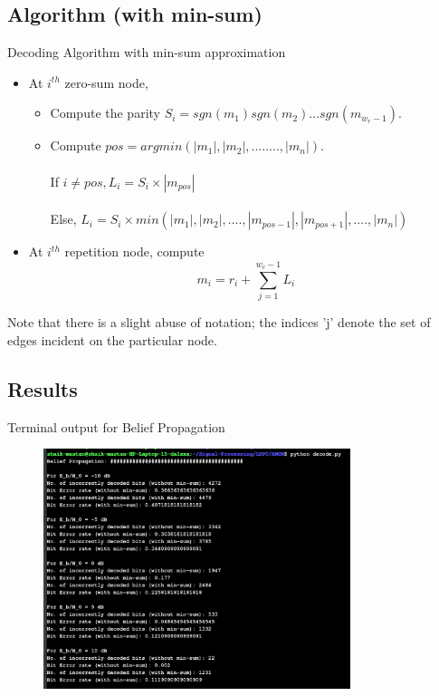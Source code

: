 \subsection{Algorithm (with min-sum)}
\begin{frame}{Decoding Algorithm with min-sum approximation}
    \begin{itemize}
        \item At $i^{th}$ zero-sum node, 
        \begin{itemize}
            \item Compute the parity $S_i = sgn(m_1)sgn(m_2)...sgn(m_{w_r-1})$.
            \item Compute $pos = argmin(|m_1|, |m_2|, ........, |m_n|)$. \\~\\
                If $ i \neq pos, L_{i} = S_i \times |m_{pos}| $ \\~\\
                Else,  $ L_{i} = S_i \times min(|m_1|, |m_2|, ...., |m_{pos-1}|,  |m_{pos+1}|, ...., |m_n|) $
        \end{itemize}
        
        \item At $i^{th}$ repetition node, compute $$m_i = r_i + \sum_{j = 1}^{w_c-1} L_i$$
    \end{itemize}
    
Note that there is a slight abuse of notation; the indices 'j' denote the set of edges incident on the particular node.
\end{frame}

\subsection{Results}
\begin{frame}
\begin{block}{Terminal output for Belief Propagation}
    \begin{figure}
		\includegraphics[width=0.8\textwidth]{AWGN/terminalAWGN_1.png}
	\end{figure}
\end{block}
\end{frame}


